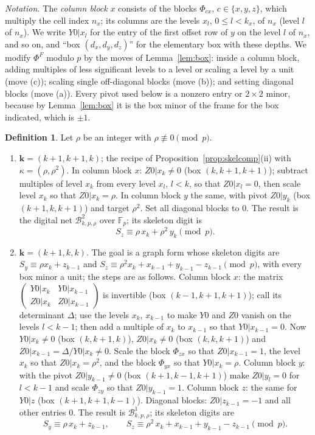 \documentclass[11pt]{amsart}
\theoremstyle{definition}
\newtheorem{definition}[theorem]{Definition}
\theoremstyle{plain}
\newcommand{\F}{\mathbb{F}}
\begin{document}
\emph{Notation.} The \emph{column block} $x$ consists of the blocks $\Phi_{cx}$, $c\in\{x,y,z\}$, which multiply the cell index $n_x$; its columns are the levels $x_l$, $0\le l<k_x$, of $n_x$ (level $l$ of $n_x$). We write $Y0|x_l$ for the entry of the first offset row of $y$ on the level $l$ of $n_x$, and so on, and ``box $(d_x,d_y,d_z)$'' for the elementary box with these depths. We modify $\Phi^F$ modulo $p$ by the moves of Lemma~\ref{lem:box}: inside a column block, adding multiples of less significant levels to a level or scaling a level by a unit (move (c)); scaling single off-diagonal blocks (move (b)); and setting diagonal blocks (move (a)). Every pivot used below is a nonzero entry or $2\times2$ minor, because by Lemma~\ref{lem:box} it is the box minor of the frame for the box indicated, which is $\pm1$.

\begin{definition}\label{def:B}
Let $\rho$ be an integer with $\rho\not\equiv0\pmod p$.
\begin{enumerate}
\item[($\mathcal B^2$)] $\mathbf k=(k+1,k+1,k)$; the recipe of Proposition~\ref{prop:skelcomp}(ii) with $\kappa=(\rho,\rho^2)$. In column block $x$: $Z0|x_k\ne0$ (box $(k,k+1,k+1)$); subtract multiples of level $x_k$ from every level $x_l$, $l<k$, so that $Z0|x_l=0$, then scale level $x_k$ so that $Z0|x_k=\rho$. In column block $y$ the same, with pivot $Z0|y_k$ (box $(k+1,k,k+1)$) and target $\rho^2$. Set all diagonal blocks to $0$. The result is the digital net $\mathcal B^2_{k,p,\rho}$ over $\F_p$; its skeleton digit is
\[
S_z\equiv\rho\,x_k+\rho^2\,y_k\pmod p.
\]
\item[($\mathcal B^1$)] $\mathbf k=(k+1,k,k)$. The goal is a graph form whose skeleton digits are $S_y\equiv\rho x_k+z_{k-1}$ and $S_z\equiv\rho^2x_k+x_{k-1}+y_{k-1}-z_{k-1}\pmod p$, with every box minor a unit; the steps are as follows. Column block $x$: the matrix $\left(\begin{smallmatrix}Y0|x_k&Y0|x_{k-1}\\ Z0|x_k&Z0|x_{k-1}\end{smallmatrix}\right)$ is invertible (box $(k-1,k+1,k+1)$); call its determinant $\Delta$; use the levels $x_k$, $x_{k-1}$ to make $Y0$ and $Z0$ vanish on the levels $l<k-1$; then add a multiple of $x_k$ to $x_{k-1}$ so that $Y0|x_{k-1}=0$. Now $Y0|x_k\ne0$ (box $(k,k+1,k)$), $Z0|x_k\ne0$ (box $(k,k,k+1)$) and $Z0|x_{k-1}=\Delta/Y0|x_k\ne0$. Scale the block $\Phi_{zx}$ so that $Z0|x_{k-1}=1$, the level $x_k$ so that $Z0|x_k=\rho^2$, and the block $\Phi_{yx}$ so that $Y0|x_k=\rho$. Column block $y$: with the pivot $Z0|y_{k-1}\ne0$ (box $(k+1,k-1,k+1)$) make $Z0|y_l=0$ for $l<k-1$ and scale $\Phi_{zy}$ so that $Z0|y_{k-1}=1$. Column block $z$: the same for $Y0|z$ (box $(k+1,k+1,k-1)$). Diagonal blocks: $Z0|z_{k-1}=-1$ and all other entries $0$. The result is $\mathcal B^1_{k,p,\rho}$; its skeleton digits are
\[
S_y\equiv\rho\,x_k+z_{k-1},\qquad S_z\equiv\rho^2\,x_k+x_{k-1}+y_{k-1}-z_{k-1}\pmod p.
\]
\end{enumerate}
\end{definition}
\end{document}
